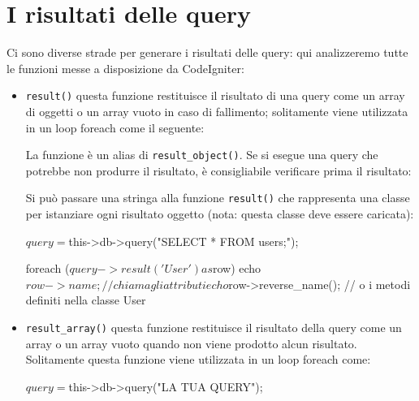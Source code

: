 \section*{I risultati delle query}
Ci sono diverse strade per generare i risultati delle query: qui analizzeremo tutte le funzioni messe a disposizione da CodeIgniter:

\begin{itemize}
\item \verb|result()| questa funzione restituisce il risultato di una query come un array di oggetti o un array vuoto in caso di fallimento; solitamente viene utilizzata in un loop foreach come il seguente:


La funzione è un alias di \verb|result_object()|. Se si esegue una query che potrebbe non produrre il risultato, è consigliabile verificare prima il risultato:


Si può passare una stringa alla funzione \verb|result()| che rappresenta una classe per istanziare ogni risultato oggetto (nota: questa classe deve essere caricata):

\begin{code}
$query = $this->db->query("SELECT * FROM users;");

foreach ($query->result('User') as $row)
{
   echo $row->name; // chiama gli attributi
   echo $row->reverse_name(); // o i metodi definiti nella classe User
}
\end{code}

\item \verb|result_array()| questa funzione restituisce il risultato della query come un array o un array vuoto quando non viene prodotto alcun risultato. Solitamente questa funzione viene utilizzata in un loop foreach come:

\begin{code}
$query = $this->db->query("LA TUA QUERY");


\end{code}
\end{itemize}
